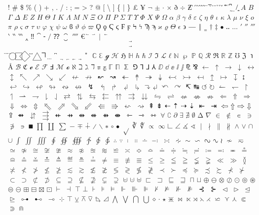 \initial{
}! 
\# 
\$ 
\% 
( 
) 
+ 
, 
. 
/ 
: 
; 
= 
> 
? 
@ 
[ 
\textbackslash 
] 
\{ 
| 
\} 
$£$ 
$¥$ 
$¬$ 
$±$ 
$·$ 
$×$ 
$ð$ 
$÷$ 
$Ƶ$ 
̀ 
́ 
̂ 
̂ 
̃ 
̃ 
̄ 
̅ 
̆ 
̇ 
̈ 
̉ 
̊ 
̌ 
̐ 
̒ 
̕ 
̚ 
̰ 
̲ 
̸ 
͍ 
$Α$ 
$Β$ 
$Γ$ 
$Δ$ 
$Ε$ 
$Ζ$ 
$Η$ 
$Θ$ 
$Ι$ 
$Κ$ 
$Λ$ 
$Μ$ 
$Ν$ 
$Ξ$ 
$Ο$ 
$Π$ 
$Ρ$ 
$Σ$ 
$Τ$ 
$Υ$ 
$Φ$ 
$Χ$ 
$Ψ$ 
$Ω$ 
$α$ 
$β$ 
$γ$ 
$δ$ 
$ε$ 
$ζ$ 
$η$ 
$θ$ 
$ι$ 
$κ$ 
$λ$ 
$μ$ 
$ν$ 
$ξ$ 
$ο$ 
$π$ 
$ρ$ 
$ς$ 
$σ$ 
$τ$ 
$υ$ 
$φ$ 
$χ$ 
$ψ$ 
$ω$ 
$ϐ$ 
$ϑ$ 
$ϕ$ 
$ϖ$ 
$Ϙ$ 
$ϙ$ 
$Ϛ$ 
$ϛ$ 
$Ϝ$ 
$ϝ$ 
$Ϟ$ 
$ϟ$ 
$Ϡ$ 
$ϡ$ 
$ϰ$ 
$ϱ$ 
$ϴ$ 
$ϵ$ 
$϶$ 
$―$ 
$‖$ 
$‗$ 
$†$ 
$‡$ 
$•$ 
$‥$ 
$…$ 
$′$ 
$″$ 
$‴$ 
$‵$ 
$‶$ 
$‷$ 
$‸$ 
$‼$ 
$⁀$ 
$⁃$ 
$⁄$ 
$⁇$ 
$⁐$ 
$⁗$ 
$€$ 
$⃐$ 
$⃑$ 
$⃒$ 
$⃖$ 
$$⃗$$ 
$$⃗$$ 
$⃛$ 
$⃜$ 
$⃝$ 
$⃞$ 
$⃟$ 
$⃡$ 
$⃤$ 
$⃧$ 
$⃨$ 
$⃩$ 
$⃬$ 
$⃭$ 
$⃮$ 
$⃯$ 
$⃰$ 
$ℂ$ 
$ℇ$ 
$ℊ$ 
$ℋ$ 
$ℌ$ 
$ℍ$ 
$ℎ$ 
$ℏ$ 
$ℐ$ 
$ℑ$ 
$ℒ$ 
$ℓ$ 
$ℕ$ 
$℘$ 
$ℙ$ 
$ℚ$ 
$ℛ$ 
$ℜ$ 
$ℝ$ 
$ℤ$ 
$℧$ 
$ℨ$ 
$℩$ 
$Å$ 
$ℬ$ 
$ℭ$ 
$ℯ$ 
$ℰ$ 
$ℱ$ 
$Ⅎ$ 
$ℳ$ 
$ℴ$ 
$ℵ$ 
$ℶ$ 
$ℷ$ 
$ℸ$ 
$ℼ$ 
$ℽ$ 
$ℾ$ 
$ℿ$ 
$⅀$ 
$⅁$ 
$⅂$ 
$⅃$ 
$⅄$ 
$ⅅ$ 
$ⅆ$ 
$ⅇ$ 
$ⅈ$ 
$ⅉ$ 
$⅊$ 
$⅋$ 
$←$ 
$↑$ 
$→$ 
$↓$ 
$↔$ 
$↕$ 
$↖$ 
$↗$ 
$↘$ 
$↙$ 
$↚$ 
$↛$ 
$↜$ 
$↝$ 
$↞$ 
$↟$ 
$↠$ 
$↡$ 
$↢$ 
$↣$ 
$↤$ 
$↥$ 
$↦$ 
$↧$ 
$↨$ 
$↩$ 
$↪$ 
$↫$ 
$↬$ 
$↭$ 
$↮$ 
$↯$ 
$↰$ 
$↱$ 
$↲$ 
$↳$ 
$↴$ 
$↵$ 
$↶$ 
$↷$ 
$↸$ 
$↹$ 
$↺$ 
$↻$ 
$↼$ 
$↽$ 
$↾$ 
$↿$ 
$⇀$ 
$⇁$ 
$⇂$ 
$⇃$ 
$⇄$ 
$⇅$ 
$⇆$ 
$⇇$ 
$⇈$ 
$⇉$ 
$⇊$ 
$⇋$ 
$⇌$ 
$⇍$ 
$⇎$ 
$⇏$ 
$⇐$ 
$⇑$ 
$⇒$ 
$⇓$ 
$⇔$ 
$⇕$ 
$⇖$ 
$⇗$ 
$⇘$ 
$⇙$ 
$⇚$ 
$⇛$ 
$⇜$ 
$⇝$ 
$⇞$ 
$⇟$ 
$⇠$ 
$⇡$ 
$⇢$ 
$⇣$ 
$⇤$ 
$⇥$ 
$⇦$ 
$⇧$ 
$⇨$ 
$⇩$ 
$⇪$ 
$⇴$ 
$⇵$ 
$⇶$ 
$⇷$ 
$⇸$ 
$⇹$ 
$⇺$ 
$⇻$ 
$⇼$ 
$⇽$ 
$⇾$ 
$⇿$ 
$∀$ 
$∁$ 
$∂$ 
$∃$ 
$∄$ 
$∅$ 
$∆$ 
$∇$ 
$∈$ 
$∉$ 
$∊$ 
$∋$ 
$∌$ 
$∍$ 
$∎$ 
$∏$ 
$∐$ 
$∑$ 
$−$ 
$∓$ 
$∔$ 
$∕$ 
$∖$ 
$∗$ 
$∘$ 
$∙$ 
$√$ 
$∛$ 
$∜$ 
$∝$ 
$∞$ 
$∟$ 
$∠$ 
$∡$ 
$∢$ 
$∣$ 
$∤$ 
$∥$ 
$∦$ 
$∧$ 
$∨$ 
$∩$ 
$∪$ 
$∫$ 
$∬$ 
$∭$ 
$∮$ 
$∯$ 
$∰$ 
$∱$ 
$∲$ 
$∳$ 
$∴$ 
$∵$ 
$∶$ 
$∷$ 
$∸$ 
$∹$ 
$∺$ 
$∻$ 
$∼$ 
$∽$ 
$∾$ 
$∿$ 
$≀$ 
$≁$ 
$≂$ 
$≃$ 
$≄$ 
$≅$ 
$≆$ 
$≇$ 
$≈$ 
$≉$ 
$≊$ 
$≋$ 
$≌$ 
$≍$ 
$≎$ 
$≏$ 
$≐$ 
$≑$ 
$≒$ 
$≓$ 
$≔$ 
$≕$ 
$≖$ 
$≗$ 
$≘$ 
$≙$ 
$≚$ 
$≛$ 
$≜$ 
$≝$ 
$≞$ 
$≟$ 
$≠$ 
$≡$ 
$≢$ 
$≣$ 
$≤$ 
$≥$ 
$≦$ 
$≧$ 
$≨$ 
$≩$ 
$≪$ 
$≫$ 
$≬$ 
$≭$ 
$≮$ 
$≯$ 
$≰$ 
$≱$ 
$≲$ 
$≳$ 
$≴$ 
$≵$ 
$≶$ 
$≷$ 
$≸$ 
$≹$ 
$≺$ 
$≻$ 
$≼$ 
$≽$ 
$≾$ 
$≿$ 
$⊀$ 
$⊁$ 
$⊂$ 
$⊃$ 
$⊄$ 
$⊅$ 
$⊆$ 
$⊇$ 
$⊈$ 
$⊉$ 
$⊊$ 
$⊋$ 
$⊌$ 
$⊍$ 
$⊎$ 
$⊏$ 
$⊐$ 
$⊑$ 
$⊒$ 
$⊓$ 
$⊔$ 
$⊕$ 
$⊖$ 
$⊗$ 
$⊘$ 
$⊙$ 
$⊚$ 
$⊛$ 
$⊜$ 
$⊝$ 
$⊞$ 
$⊟$ 
$⊠$ 
$⊡$ 
$⊢$ 
$⊣$ 
$⊤$ 
$⊥$ 
$⊦$ 
$⊧$ 
$⊨$ 
$⊩$ 
$⊪$ 
$⊫$ 
$⊬$ 
$⊭$ 
$⊮$ 
$⊯$ 
$⊰$ 
$⊱$ 
$⊲$ 
$⊳$ 
$⊴$ 
$⊵$ 
$⊶$ 
$⊷$ 
$⊸$ 
$⊹$ 
$⊺$ 
$⊻$ 
$⊼$ 
$⊽$ 
$⊾$ 
$⊿$ 
$⋀$ 
$⋁$ 
$⋂$ 
$⋃$ 
$⋄$ 
$⋅$ 
$⋆$ 
$⋇$ 
$⋈$ 
$⋉$ 
$⋊$ 
$⋋$ 
$⋌$ 
$⋍$ 
$⋎$ 
$⋏$ 
$⋐$ 
$⋑$ 
$⋒$ 
